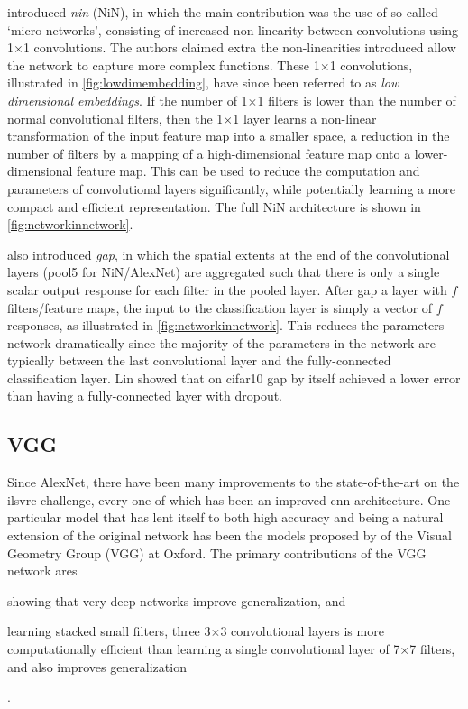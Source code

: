 \documentclass[thesis]{subfiles}
\begin{document}
\citet{Lin2013NiN} introduced \emph{\gls{nin}} (NiN), in which the main contribution was the use of so-called `micro networks', consisting of increased non-linearity between convolutions using 1$\times$1 convolutions. The authors claimed extra the non-linearities introduced allow the network to capture more complex functions. These 1$\times $1 convolutions, illustrated in \cref{fig:lowdimembedding}, have since been referred to as \emph{low dimensional embeddings}. If the number of 1$\times$1 filters is lower than the number of normal convolutional filters, then the 1$\times$1 layer learns a non-linear transformation of the input feature map into a smaller space, \ie a reduction in the number of filters by a mapping of a high-dimensional feature map onto a lower-dimensional feature map. This can be used to reduce the computation and parameters of convolutional layers significantly, while potentially learning a more compact and efficient representation. The full NiN architecture is shown in \cref{fig:networkinnetwork}.

\citet{Lin2013NiN} also introduced \emph{\gls{gap}}, in which the spatial extents at the end of the convolutional layers (\ie pool5 for NiN/AlexNet) are aggregated such that there is only a single scalar output response for each filter in the pooled layer. After \gls{gap} a layer with $f$ filters/feature maps, the input to the classification layer is simply a vector of $f$ responses, as illustrated in \cref{fig:networkinnetwork}. This reduces the parameters network dramatically since the majority of the parameters in the network are typically between the last convolutional layer and the fully-connected classification layer. Lin \etal showed that on \gls{cifar10} \gls{gap} by itself achieved a lower error than having a fully-connected layer with dropout.

\subsection{VGG}
Since AlexNet, there have been many improvements to the state-of-the-art on the \gls{ilsvrc} challenge, every one of which has been an improved \gls{cnn} architecture. One particular model that has lent itself to both high accuracy and being a natural extension of the original network has been the models proposed by \citet{Simonyan2014verydeep} of the Visual Geometry Group (VGG) at Oxford. The primary contributions of the VGG network ares
\begin{enumerate*}[label = (\textbf{\roman*})]
\item showing that very deep networks improve generalization, and
\item learning stacked small filters, \ie three 3$\times$3 convolutional layers is more computationally efficient than learning a single convolutional layer of 7$\times$7 filters, and also improves generalization
\end{enumerate*}.
\end{document}
